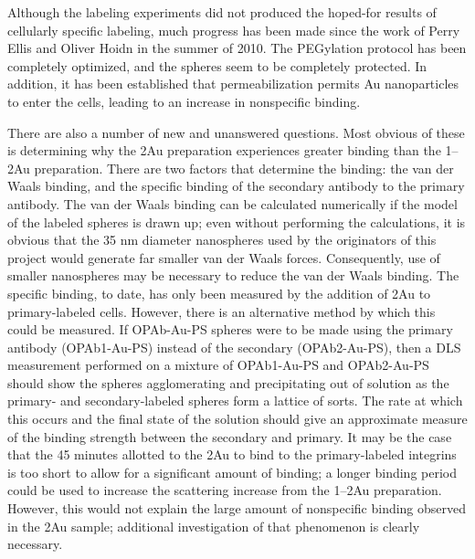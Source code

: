 Although the labeling experiments did not produced the hoped-for results of cellularly specific labeling, much progress has been made since the work of Perry Ellis and Oliver Hoidn in the summer of 2010. The PEGylation protocol has been completely optimized, and the spheres seem to be completely protected. In addition, it has been established that permeabilization permits Au nanoparticles to enter the cells, leading to an increase in nonspecific binding.

There are also a number of new and unanswered questions. Most obvious of these is determining why the 2Au preparation experiences greater binding than the 1--2Au preparation. There are two factors that determine the binding: the van der Waals binding, and the specific binding of the secondary antibody to the primary antibody. The van der Waals binding can be calculated numerically if the model of the labeled spheres is drawn up; even without performing the calculations, it is obvious that the 35 nm diameter nanospheres used by the originators of this project would generate far smaller van der Waals forces. Consequently, use of smaller nanospheres may be necessary to reduce the van der Waals binding. The specific binding, to date, has only been measured by the addition of 2Au to primary-labeled cells. However, there is an alternative method by which this could be measured. If OPAb-Au-PS spheres were to be made using the primary antibody (OPAb1-Au-PS) instead of the secondary (OPAb2-Au-PS), then a DLS measurement performed on a mixture of OPAb1-Au-PS and OPAb2-Au-PS should show the spheres agglomerating and precipitating out of solution as the primary- and secondary-labeled spheres form a lattice of sorts. The rate at which this occurs and the final state of the solution should give an approximate measure of the binding strength between the secondary and primary. It may be the case that the 45 minutes allotted to the 2Au to bind to the primary-labeled integrins is too short to allow for a significant amount of binding; a longer binding period could be used to increase the scattering increase from the 1--2Au preparation. However, this would not explain the large amount of nonspecific binding observed in the 2Au sample; additional investigation of that phenomenon is clearly necessary.
